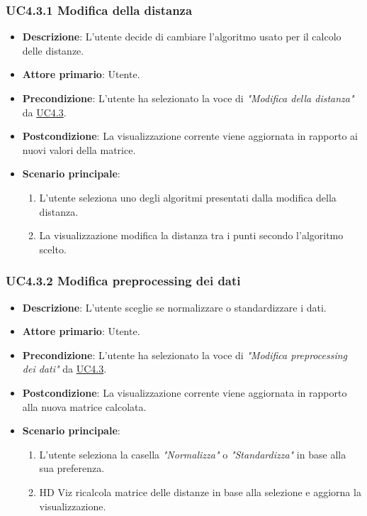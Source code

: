\subsubsection{UC4.3.1 Modifica della distanza}
\label{ssub:uc4.3.1}
\begin{itemize}
    \item \textbf{Descrizione}: L’utente decide di cambiare l’algoritmo usato per il calcolo delle distanze.

    \item \textbf{Attore primario}: Utente.
    
    \item \textbf{Precondizione}:   L'utente ha selezionato la voce di \emph{"Modifica della distanza"} da \hyperref[ssub:uc4.3]{UC4.3}.
    \item \textbf{Postcondizione}:  La visualizzazione corrente viene aggiornata in rapporto ai nuovi valori della matrice.

	\item \textbf{Scenario principale}:
        \begin{enumerate}
            \item L'utente seleziona uno degli algoritmi presentati dalla modifica della distanza.
            \item La visualizzazione modifica la distanza tra i punti secondo l'algoritmo scelto.
        \end{enumerate}
\end{itemize}

\subsubsection{UC4.3.2 Modifica preprocessing dei dati}
\label{ssub:uc4.3.2}
\begin{itemize}
    \item \textbf{Descrizione}: L’utente sceglie se normalizzare o standardizzare i dati.

    \item \textbf{Attore primario}: Utente.
    \item \textbf{Precondizione}: L'utente ha selezionato la voce di \emph{"Modifica preprocessing dei dati"} da \hyperref[ssub:uc4.3]{UC4.3}.
    \item \textbf{Postcondizione}: La visualizzazione corrente viene aggiornata in rapporto alla nuova matrice calcolata.
    \item \textbf{Scenario principale}:
    \begin{enumerate}
        \item L'utente seleziona la casella \emph{"Normalizza"} o \emph{"Standardizza"} in base alla sua preferenza.
        \item HD Viz ricalcola matrice delle distanze in base alla selezione e aggiorna la visualizzazione.
    \end{enumerate}
\end{itemize}

